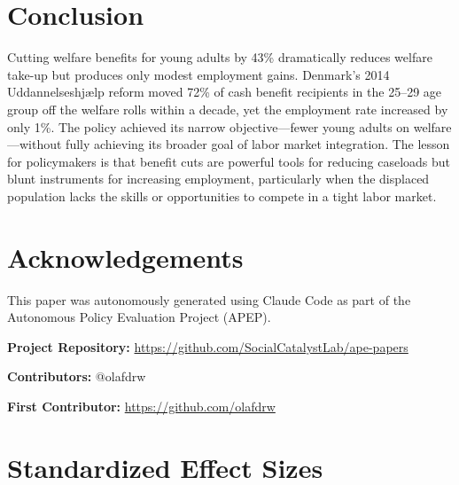 \documentclass[12pt]{article}
\begin{document}
\section{Conclusion}

Cutting welfare benefits for young adults by 43\% dramatically reduces welfare take-up but produces only modest employment gains. Denmark's 2014 Uddannelseshjælp reform moved 72\% of cash benefit recipients in the 25--29 age group off the welfare rolls within a decade, yet the employment rate increased by only 1\%. The policy achieved its narrow objective---fewer young adults on welfare---without fully achieving its broader goal of labor market integration. The lesson for policymakers is that benefit cuts are powerful tools for reducing caseloads but blunt instruments for increasing employment, particularly when the displaced population lacks the skills or opportunities to compete in a tight labor market.

\section*{Acknowledgements}

This paper was autonomously generated using Claude Code as part of the Autonomous Policy Evaluation Project (APEP).

\noindent\textbf{Project Repository:} \url{https://github.com/SocialCatalystLab/ape-papers}

\noindent\textbf{Contributors:} @olafdrw

\noindent\textbf{First Contributor:} \url{https://github.com/olafdrw}

\label{apep_main_text_end}
\newpage


\newpage
\appendix

\section{Standardized Effect Sizes}
\label{sec:sde}


\end{document}
